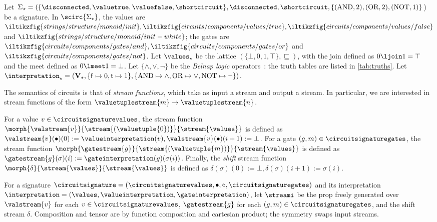 \documentclass[10pt]{article}
\begin{document}
    \begin{example}\label{ex:interp}
        Let \(\Sigma_\star = (\{\disconnected,\valuetrue,\valuefalse,\shortcircuit\}, \disconnected, \shortcircuit, \{(\text{AND},2),(\text{OR},2),(\text{NOT},1)\}\)) be a signature.
        In \(\scirc{\Sigma_\star}\), the values are \(\iltikzfig{strings/structure/monoid/init}, \iltikzfig{circuits/components/values/true}, \iltikzfig{circuits/components/values/false}\) and \(\iltikzfig{strings/structure/monoid/init-white}\); the gates are \(\iltikzfig{circuits/components/gates/and}, \iltikzfig{circuits/components/gates/or}\) and \(\iltikzfig{circuits/components/gates/not}\).
        Let \(\values_\star\) be the lattice \((\{\bot, 0, 1, \top\},\sqsubseteq)\), with the join defined as \(0 \ljoin 1 = \top\) and the meet defined as \(0 \lmeet 1 = \bot\).
        Let \(\{\wedge,\vee,\neg\}\) be the \emph{Belnap logic} operators~\cite{belnap1977useful}: the truth tables are listed in \cref{tab:truths}.
        Let \(\interpretation_\star = (\mathbf{V}_\star, \{\mathsf{f} \mapsto 0, \mathsf{t} \mapsto 1\}, \{\text{AND} \mapsto \land, \text{OR} \mapsto \lor, \text{NOT} \mapsto \neg\})\).
    \end{example}

    \noindent
    The semantics of circuits is that of \emph{stream functions}, which take as input a stream and output a stream.
    In particular, we are interested in stream functions of the form \(\valuetuplestream{m} \to \valuetuplestream{n}\).

    \begin{example}
        For a value \(v \in \circuitsignaturevalues\), the stream function \(\morph{\valstream{v}}{\stream{(\valuetuple{0})}}{\stream{\values}}\) is defined as \(\valstream{v}(\bullet)(0) := \valueinterpretation(v), \valstream{v}(\bullet)(i+1) := \bot\). 
        For a gate \((g,m) \in \circuitsignaturegates\), the stream function \(\morph{\gatestream{g}}{\stream{(\valuetuple{m})}}{\stream{\values}}\) is defined as \(\gatestream{g}(\sigma)(i) := \gateinterpretation(g)(\sigma(i))\).
        Finally, the \emph{shift} stream function \(\morph{\delta}{\stream{\values}}{\stream{\values}}\) is defined as \(\delta(\sigma)(0) := \bot, \delta(\sigma)(i+1) := \sigma(i)\).
    \end{example}
    
    \begin{definition}
        For a signature \(\circuitsignature = (\circuitsignaturevalues,\bullet,\circ,\circuitsignaturegates)\) and its interpretation \(\interpretation = (\values, \valueinterpretation, \gateinterpretation)\), let \(\streami\) be the prop freely generated over \(\valstream{v}\) for each \(v \in \circuitsignaturevalues\), \(\gatestream{g}\) for each \((g,m) \in \circuitsignaturegates\), and the shift stream \(\delta\).
        Composition and tensor are by function composition and cartesian product; the symmetry swaps input streams.
    \end{definition}
\end{document}
